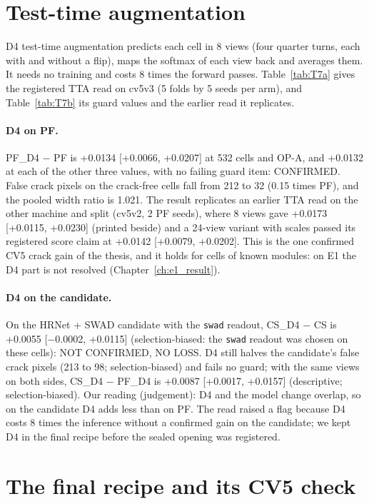 \section{Test-time augmentation}\label{sec:m-tta}

D4 test-time augmentation predicts each cell in 8 views (four quarter turns, each with and without a flip), maps the softmax of
each view back and averages them. It needs no training and costs 8 times the forward passes. Table~\ref{tab:T7a} gives the
registered TTA read on cv5v3 (5 folds by 5 seeds per arm), and Table~\ref{tab:T7b} its guard values and the earlier read it
replicates.

\paragraph{D4 on PF.} PF\_D4 $-$ PF is +0.0134 [+0.0066, +0.0207] at 532 cells and OP-A, and +0.0132 at each of the other three
values, with no failing guard item: CONFIRMED. False crack pixels on the crack-free cells fall from 212 to 32 (0.15 times PF), and
the pooled width ratio is 1.021. The result replicates an earlier TTA read on the other machine and split (cv5v2, 2 PF seeds),
where 8 views gave +0.0173 [+0.0115, +0.0230] (printed beside) and a 24-view variant with scales passed its registered score claim
at +0.0142 [+0.0079, +0.0202]. This is the one confirmed CV5 crack gain of the thesis, and it holds for cells of known modules: on E1
the D4 part is not resolved (Chapter~\ref{ch:e1_result}).

\paragraph{D4 on the candidate.} On the HRNet + SWAD candidate with the \texttt{swad} readout, CS\_D4 $-$ CS is +0.0055
[$-$0.0002, +0.0115] (selection-biased: the \texttt{swad} readout was chosen on these cells): NOT CONFIRMED, NO LOSS. D4 still
halves the candidate's false crack pixels (213 to 98; selection-biased) and fails no guard; with the same views on both sides,
CS\_D4 $-$ PF\_D4 is +0.0087 [+0.0017, +0.0157] (descriptive; selection-biased). Our reading (judgement): D4
and the model change overlap, so on the candidate D4 adds less than on PF. The read raised a flag because D4 costs 8 times the
inference without a confirmed gain on the candidate; we kept D4 in the final recipe before the sealed opening was registered.

\section{The final recipe and its CV5 check}\label{sec:m-final}

